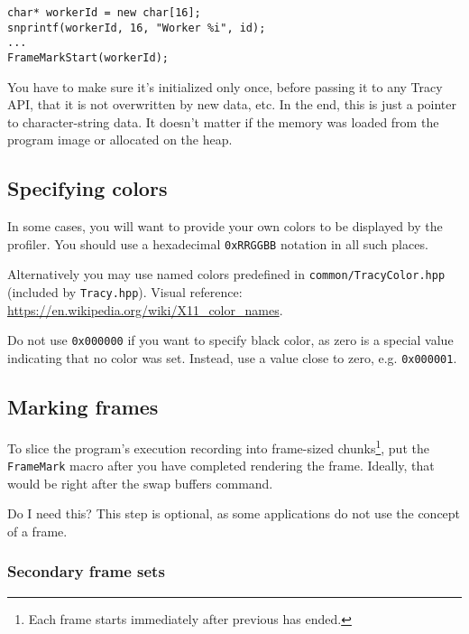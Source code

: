 \documentclass[hidelinks,titlepage,a4paper,twoside]{article}
\begin{document}
\begin{lstlisting}
char* workerId = new char[16];
snprintf(workerId, 16, "Worker %i", id);
...
FrameMarkStart(workerId);
\end{lstlisting}

You have to make sure it's initialized only once, before passing it to any Tracy API, that it is not overwritten by new data, etc. In the end, this is just a pointer to character-string data. It doesn't matter if the memory was loaded from the program image or allocated on the heap.

\subsection{Specifying colors}

In some cases, you will want to provide your own colors to be displayed by the profiler. You should use a hexadecimal \texttt{0xRRGGBB} notation in all such places.

Alternatively you may use named colors predefined in \texttt{common/TracyColor.hpp} (included by \texttt{Tracy.hpp}). Visual reference: \url{https://en.wikipedia.org/wiki/X11_color_names}.

Do not use \texttt{0x000000} if you want to specify black color, as zero is a special value indicating that no color was set. Instead, use a value close to zero, e.g. \texttt{0x000001}.

\subsection{Marking frames}
\label{markingframes}

To slice the program's execution recording into frame-sized chunks\footnote{Each frame starts immediately after previous has ended.}, put the \texttt{FrameMark} macro after you have completed rendering the frame. Ideally, that would be right after the swap buffers command.

\begin{bclogo}[
noborder=true,
couleur=black!5,
logo=\bclampe
]{Do I need this?}
This step is optional, as some applications do not use the concept of a frame.
\end{bclogo}

\subsubsection{Secondary frame sets}
\label{secondaryframeset}
\end{document}
